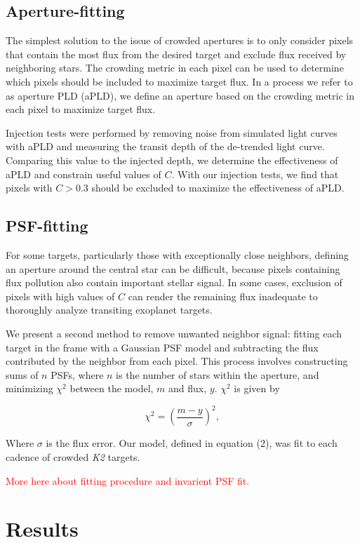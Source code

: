 \documentclass[12pt,preprint]{aastex}
\begin{document}
\subsection{Aperture-fitting}

The simplest solution to the issue of crowded apertures is to only consider pixels that contain the most flux from the desired target and exclude flux received by neighboring stars. The crowding metric in each pixel can be used to determine which pixels should be included to maximize target flux. In a process we refer to as aperture PLD (aPLD), we define an aperture based on the crowding metric in each pixel to maximize target flux.

Injection tests were performed by removing noise from simulated light curves with aPLD and measuring the transit depth of the de-trended light curve. Comparing this value to the injected depth, we determine the effectiveness of aPLD and constrain useful values of $C$. With our injection tests, we find that pixels with $C>0.3$ should be excluded to maximize the effectiveness of aPLD.

\subsection{PSF-fitting}

For some targets, particularly those with exceptionally close neighbors, defining an aperture around the central star can be difficult, because pixels containing flux pollution also contain important stellar signal. In some cases, exclusion of pixels with high values of $C$ can render the remaining flux inadequate to thoroughly analyze transiting exoplanet targets.

We present a second method to remove unwanted neighbor signal: fitting each target in the frame with a Gaussian PSF model and subtracting the flux contributed by the neighbor from each pixel. This process involves constructing sums of $n$ PSFs, where $n$ is the number of stars within the aperture, and minimizing $\chi^2$ between the model, $m$ and flux, $y$. $\chi^2$ is given by

\[
\tag{5}
\chi^2 = \left( \frac{m-y}{\sigma} \right)^2,
\]

Where $\sigma$ is the flux error. Our model, defined in equation (2), was fit to each cadence of crowded \textit{K2} targets.

\textcolor{red}{More here about fitting procedure and invarient PSF fit.}


\section{Results}
\end{document}
